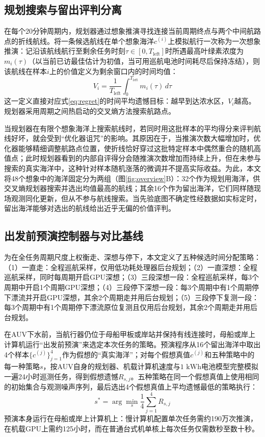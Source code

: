 \subsection{规划搜索与留出评判分离}

在每个20分钟周期内，规划器通过想象推演寻找连接当前周期终点与两个中间航路点的折线航线。将一条候选航线在单个想象海洋$c^{(i)}$上模拟航行一次称为一次想象推演：记沿该航线航行至剩余任务时刻$\tau \in [0, T_{\text{left}}]$时所遇最高叶绿素浓度为$m_i(\tau)$（以当前已访最佳估计为初值，当可用巡航电池时间耗尽后保持冻结），则该航线在样本$i$上的价值定义为剩余窗口内的时间均值：
\begin{equation}
  V_i = \frac{1}{T_{\text{left}}}\int_0^{T_{\text{left}}} m_i(\tau)\, d\tau
  \label{eq:route_value}
\end{equation}
这一定义直接对应式\eqref{eq:regret}的时间平均遗憾目标：越早到达浓水区，$V_i$越高。规划器采用周期之间热启动的交叉熵方法\cite{deboer2005cem}搜索航路点。

当规划器在有限个想象海洋上搜索航线时，若同时用这批样本的平均得分来评判航线好坏，就会受到“优化器诅咒”的影响\cite{smith2006curse, vanhasselt2010double}。其原因在于，当推演次数大幅增加时，优化器能够精细调整航路点位置，使折线恰好穿过这批特定样本中偶然重合的随机高值点；此时规划器看到的内部自评得分会随推演次数增加而持续上升，但在未参与搜索的真实海洋中，这种针对样本随机涨落的微调并不提高实际收益。为此，本文将48个想象中的海洋固定分为两组（图\ref{fig:overview}B）：32个作为规划用海洋，供交叉熵规划器搜索并选出均值最高的航线；其余16个作为留出海洋，它们同样随现场观测同化更新，但从不参与航线搜索。当先验底图不确定性经数据如实标定时，留出海洋能够对选出的航线给出近乎无偏的价值评判。

\subsection{出发前预演控制器与对比基线}

为在全任务周期尺度上权衡走、深想与停下，本文定义了五种候选时间分配策略：（1）一直走：全程巡航采样，仅用低功耗处理器后台规划；（2）一直深想：全程巡航采样，同时每周期开启GPU深想；（3）三段深想一段：全程巡航采样，每3个周期中开启1个周期GPU深想；（4）三段停下深想一段：每3个周期中有1个周期停下漂流并开启GPU深想，其余2个周期走并用后台规划；（5）三段停下复测一段：每3个周期中有1个周期停下漂流原位复测且仅用后台规划，其余2个周期走并用后台规划。

在AUV下水前，当航行器仍位于母船甲板或岸站并保持有线连接时，母船或岸上计算机运行“出发前预演”来选定本次任务的策略。预演程序从16个留出海洋中取出4个样本$\{c^{(j)}\}_{j=1}^4$作为假想的“真实海洋”；对每个假想真值$c^{(j)}$和五种策略中的每一种策略$s$，按AUV自身的规划器、机载计算机速度与$1\text{ kWh}$电池模型完整模拟一遍24小时巡测任务，得到假想遗憾$R_{s,j}$。五种策略在同一个假想真值上使用相同的初始集合与观测噪声序列，最后选出4个假想真值上平均遗憾最低的策略执行：
\begin{equation}
  s^* = \arg\min_{s} \frac{1}{4}\sum_{j=1}^4 R_{s,j}
  \label{eq:rehearsal}
\end{equation}
预演本身运行在母船或岸上计算机上：慢计算机配置单次任务需约190万次推演，在机载GPU上需约125小时，而在普通台式机单核上每次任务仅需数秒至数十秒。

